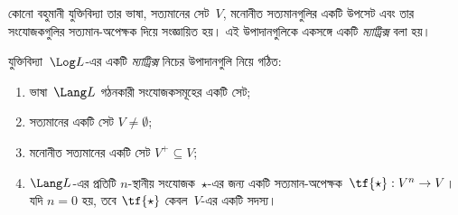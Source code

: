\documentclass[../../../include/open-logic-section]{subfiles}
\begin{document}


কোনো বহুমানী যুক্তিবিদ্যা তার ভাষা, সত্যমানের সেট~$V$, মনোনীত
সত্যমানগুলির একটি উপসেট এবং তার সংযোজকগুলির সত্যমান-অপেক্ষক দিয়ে
সংজ্ঞায়িত হয়। এই উপাদানগুলিকে একসঙ্গে একটি \emph{ম্যাট্রিক্স} বলা হয়।

\begin{defn}[ম্যাট্রিক্স]
যুক্তিবিদ্যা~$\Log L$-এর একটি \emph{ম্যাট্রিক্স} নিচের উপাদানগুলি নিয়ে
গঠিত:
\begin{enumerate}
\item ভাষা~$\Lang L$ গঠনকারী সংযোজকসমূহের একটি সেট;
\item সত্যমানের একটি সেট $V \neq \emptyset$;
\item মনোনীত সত্যমানের একটি সেট $V^+ \subseteq V$;
\item $\Lang L$-এর প্রতিটি $n$-স্থানীয় সংযোজক~$\star$-এর জন্য একটি
সত্যমান-অপেক্ষক~$\tf{\star} : V^n \to V$। যদি $n = 0$ হয়, তবে
$\tf{\star}$ কেবল~$V$-এর একটি সদস্য।
\end{enumerate}
\end{defn}
\end{document}
